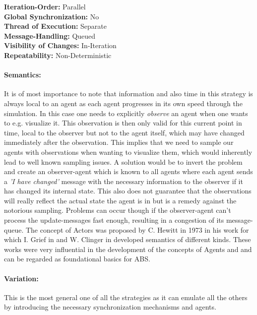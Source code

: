 \textbf{Iteration-Order:} Parallel \\
\textbf{Global Synchronization:} No \\
\textbf{Thread of Execution:} Separate \\
\textbf{Message-Handling:} Queued \\
\textbf{Visibility of Changes:}	In-Iteration \\
\textbf{Repeatability:}	Non-Deterministic 

\paragraph{Semantics:} It is of most importance to note that information and also time in this strategy is always local to an agent as each agent progresses in its own speed through the simulation. In this case one needs to explicitly \textit{observe} an agent when one wants to e.g. visualize it. This observation is then only valid for this current point in time, local to the observer but not to the agent itself, which may have changed immediately after the observation. This implies that we need to sample our agents with observations when wanting to visualize them, which would inherently lead to well known sampling issues. A solution would be to invert the problem and create an observer-agent which is known to all agents where each agent sends a \textit{'I have changed'} message with the necessary information to the observer if it has changed its internal state. This also does not guarantee that the observations will really reflect the actual state the agent is in but is a remedy against the notorious sampling. Problems can occur though if the observer-agent can't process the update-messages fast enough, resulting in a congestion of its message-queue. 
The concept of Actors was proposed by C. Hewitt in 1973 in his work \cite{hewitt_universal_1973} for which I. Grief in \cite{grief_semantics_1975} and W. Clinger in \cite{clinger_foundations_1981} developed semantics of different kinds. These works were very influential in the development of the concepts of Agents and and can be regarded as foundational basics for ABS.

\paragraph{Variation:} This is the most general one of all the strategies as it can emulate all the others by introducing the necessary synchronization mechanisms and agents.


